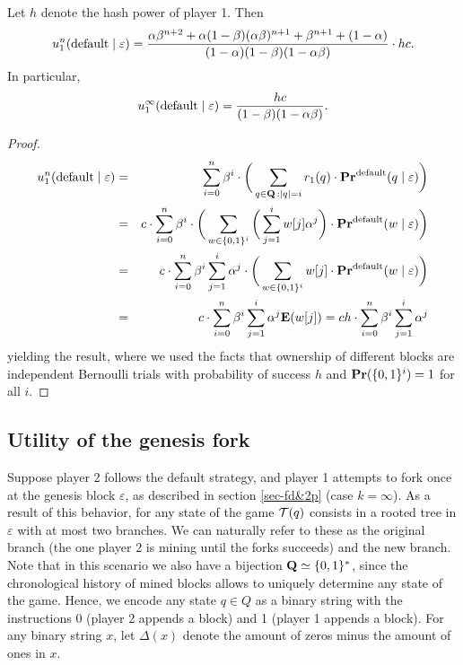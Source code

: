 \begin{myprop*}
Let $h$ denote the hash power of player 1. Then 
$$u_1^n(\text{\rm default}\mid\varepsilon) = \frac{\alpha\beta^{n+2}+\alpha(1-\beta)(\alpha\beta)^{n+1}+\beta^{n+1}+(1-\alpha)}{(1-\alpha)(1-\beta)(1-\alpha\beta)}\cdot h c.$$
In particular,
$$u_1^\infty(\text{\rm default}\mid\varepsilon) = \frac{hc}{(1-\beta)(1-\alpha\beta)}.$$
\end{myprop*}
\begin{proof}

\begin{eqnarray*}
u_1^n(\text{\rm default} \mid \varepsilon) & = & \sum_{i=0}^{n}\beta^{i} \cdot  \bigg(\sum_{\substack{q \in \mathbf{Q} \,: |q| = i}} r_1(q) \cdot 
\mathbf{Pr}^{\text{\rm default}}(q \mid \varepsilon)\bigg)\\
							& = & c\cdot \sum_{i=0}^{n}\beta^{i} \cdot\bigg(\sum_{w\in\{0,1\}^i}  \bigg( \sum_{j=1}^{i}w[j] \alpha^j \bigg)\cdot 
\mathbf{Pr}^{\text{\rm default}}(w \mid \varepsilon)\bigg)\\
							& = & c\cdot \sum_{i=0}^{n}\beta^{i}\sum_{j=1}^{i} \alpha^j \cdot\bigg(\sum_{w\in\{0,1\}^i}   w[j]\cdot 
\mathbf{Pr}^{\text{\rm default}}(w \mid \varepsilon)\bigg)\\
							& = & c\cdot \sum_{i=0}^{n}\beta^{i}\sum_{j=1}^{i} \alpha^j \mathbf{E}(w[j]) = ch\cdot \sum_{i=0}^{n}\beta^{i}\sum_{j=1}^{i} \alpha^j 
\end{eqnarray*}
yielding the result, where we used the facts that ownership of different blocks are independent Bernoulli trials with probability of success $h$ and $\mathbf{Pr}(\{0,1\}^i)=1$ for all $i$.
\end{proof}

\subsection{Utility of the genesis fork}
\label{sec-genfork}
Suppose player 2 follows the default strategy, and player 1 attempts to fork once at the genesis block $\varepsilon$, as described in section \ref{sec-fd&2p} (case $k=\infty$).
 As a result of this behavior, for any state of the game $\mathcal{T}(q)$ consists in a rooted tree in $\varepsilon$ with at most two branches. We can naturally refer to these as the original branch (the one player 2 is mining until the forks succeeds) and the new branch. Note that in this scenario we also have a bijection $\mathbf{Q}\simeq \{0,1\}^\ast$, since the chronological history of mined blocks allows to uniquely determine any state of the game. Hence, we encode any state $q\in Q$ as a binary string with the instructions 0 (player 2 appends a block) and 1 (player 1 appends a block). For any binary string $x$, let $\Delta(x)$ denote the amount of zeros minus the amount of ones in $x$.

